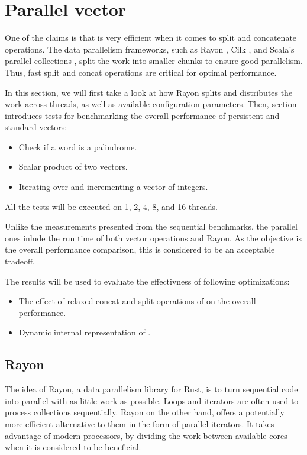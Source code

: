 \section{Parallel vector}
One of the claims is that \rrbvec{} is very efficient when it comes to split and concatenate operations. The data parallelism frameworks, such as Rayon , Cilk , and Scala's parallel collections , split the work into smaller chunks to ensure good parallelism. Thus, fast split and concat operations are critical for optimal performance. 

In this section, we will first take a look at how Rayon splits and distributes the work across threads, as well as available configuration parameters. Then, section \todo{} introduces tests for benchmarking the overall performance of persistent and standard vectors:

\begin{itemize}    
    \item Check if a word is a palindrome. 
    \item Scalar product of two vectors.
    \item Iterating over and incrementing a vector of integers.
\end{itemize}

All the tests will be executed on 1, 2, 4, 8, and 16 threads. 

Unlike the measurements presented from the sequential benchmarks, the parallel ones inlude the run time of both vector operations and Rayon. As the objective is the overall performance comparison, this is considered to be an acceptable tradeoff. 

The results will be used to evaluate the effectivness of following optimizations:
\begin{itemize}
    \item The effect of relaxed concat and split operations of \rrbvec{} on the overall performance. 
    \item Dynamic internal representation of \pvec{}.     
\end{itemize}

\subsection{Rayon}
The idea of Rayon, a data parallelism library for Rust, is to turn sequential code into parallel with as little work as possible. Loops and iterators are often used to process collections sequentially. Rayon on the other hand, offers a potentially more efficient alternative to them in the form of parallel iterators. It takes advantage of modern processors, by dividing the work between available cores when it is considered to be beneficial. 

